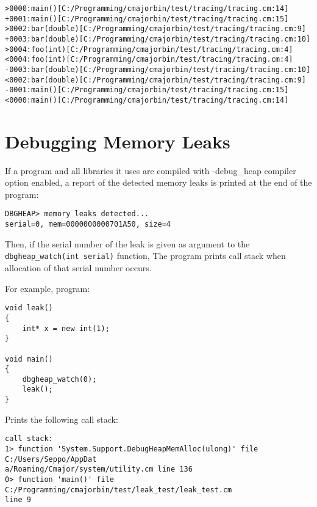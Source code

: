 \documentclass[oneside, a4paper, 11pt]{article}
\begin{document}
\begin{verbatim}
>0000:main()[C:/Programming/cmajorbin/test/tracing/tracing.cm:14]
+0001:main()[C:/Programming/cmajorbin/test/tracing/tracing.cm:15]
>0002:bar(double)[C:/Programming/cmajorbin/test/tracing/tracing.cm:9]
+0003:bar(double)[C:/Programming/cmajorbin/test/tracing/tracing.cm:10]
>0004:foo(int)[C:/Programming/cmajorbin/test/tracing/tracing.cm:4]
<0004:foo(int)[C:/Programming/cmajorbin/test/tracing/tracing.cm:4]
-0003:bar(double)[C:/Programming/cmajorbin/test/tracing/tracing.cm:10]
<0002:bar(double)[C:/Programming/cmajorbin/test/tracing/tracing.cm:9]
-0001:main()[C:/Programming/cmajorbin/test/tracing/tracing.cm:15]
<0000:main()[C:/Programming/cmajorbin/test/tracing/tracing.cm:14]
\end{verbatim}

\section{Debugging Memory Leaks}

If a program and all libraries it uses are compiled with -debug\_heap compiler option enabled,
a report of the detected memory leaks is printed at the end of the program:

\begin{verbatim}
DBGHEAP> memory leaks detected...
serial=0, mem=0000000000701A50, size=4
\end{verbatim}

Then, if the serial number of the leak is given as argument to the \verb|dbgheap_watch(int serial)| function,
The program prints call stack when allocation of that serial number occurs.

For example, program:

\begin{verbatim}
void leak()
{
    int* x = new int(1);
}

void main()
{
    dbgheap_watch(0);
    leak();
}
\end{verbatim}

Prints the following call stack:

\begin{verbatim}
call stack:
1> function 'System.Support.DebugHeapMemAlloc(ulong)' file C:/Users/Seppo/AppDat
a/Roaming/Cmajor/system/utility.cm line 136
0> function 'main()' file C:/Programming/cmajorbin/test/leak_test/leak_test.cm
line 9
\end{verbatim}
\end{document}

